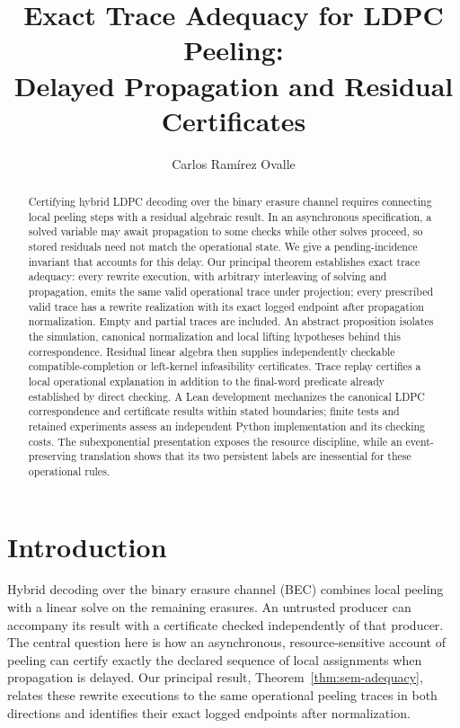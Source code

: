 \documentclass{lmcs}
\begin{document}
\title[Exact Trace Adequacy for LDPC Peeling]{Exact Trace Adequacy for LDPC Peeling:\texorpdfstring{\\}{ }Delayed Propagation and Residual Certificates}
\author[C.~Ram\'irez~Ovalle]{Carlos Ram\'irez Ovalle}
\address{Pontificia Universidad Javeriana, Cali, Colombia}
\begin{abstract}
Certifying hybrid LDPC decoding over the binary erasure channel requires
connecting local peeling steps with a residual algebraic result. In an
asynchronous specification, a solved variable may await propagation to
some checks while other solves proceed, so stored residuals need not
match the operational state. We give a pending-incidence invariant that
accounts for this delay. Our principal theorem establishes exact
trace adequacy: every rewrite execution, with arbitrary interleaving of
solving and propagation, emits the same valid operational trace under
projection; every prescribed valid trace has a rewrite realization with
its exact logged endpoint after propagation normalization. Empty and
partial traces are included. An abstract proposition isolates the
simulation, canonical normalization and local lifting hypotheses behind
this correspondence. Residual linear algebra then supplies independently
checkable compatible-completion or left-kernel infeasibility certificates.
Trace replay certifies a local operational explanation in addition to
the final-word predicate already established by direct checking.
A Lean development mechanizes the canonical LDPC correspondence and
certificate results within stated boundaries; finite tests and retained
experiments assess an independent Python implementation and its checking
costs. The subexponential presentation exposes the resource discipline,
while an event-preserving translation shows that its two persistent
labels are inessential for these operational rules.
\end{abstract}
\maketitle

\section{Introduction}
Hybrid decoding over the binary erasure channel (BEC) combines local
peeling with a linear solve on the remaining erasures. An untrusted
producer can accompany its result with a certificate checked independently
of that producer. The central question here is how an asynchronous,
resource-sensitive account of peeling can certify exactly the declared
sequence of local assignments when propagation is delayed. Our principal
result, Theorem~\ref{thm:sem-adequacy}, relates these rewrite executions
to the same operational peeling traces in both directions and identifies
their exact logged endpoints after normalization.
\end{document}
